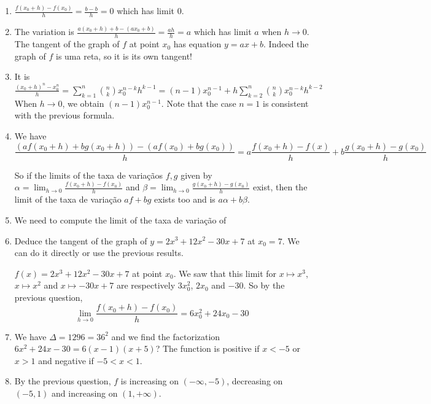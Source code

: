 \begin{enumerate}
\item $\frac{f(x_0+h)-f(x_0)}{h} = \frac{b-b}{h} = 0$ which has limit $0$.

\item The variation is
  $\frac{a{(x_0+h)}+b - {(ax_0+b)}}{h} = \frac{ah}{h} = a$ which has limit $a$
  when $h \rightarrow 0$. The tangent of the graph of $f$ at point $x_0$ has
  equation $y = ax + b$. Indeed the graph of $f$ is uma reta, so it is its own
  tangent!

\item
  It is $\frac{{(x_0+h)}^n - x_0^n}{h} =
  \sum_{k=1}^{n} \binom{n}{k} x_0^{n-k} h^{k-1} =
  {(n-1)} x_0^{n-1} + h \sum_{k=2}^{n} \binom{n}{k} x_0^{n-k} h^{k-2}$
  When $h \rightarrow 0$, we obtain $(n-1)x_0^{n-1}$. Note that the case $n=1$
  is consistent with the previous formula.

\item
  We have
  $$\frac{{(af({x_0+h})+bg({x_0+h}))} - \left(af(x_0)+bg(x_0)\right)}{h} =
  a \frac{f({x_0+h}) - f(x)}{h} + b \frac{g({x_0+h}) - g(x_0)}{h}$$

  So if the limits of the taxa de variaçãos $f,g$ given by
  $\alpha = \lim_{h\rightarrow0} \frac{f({x_0+h}) - f(x_0)}{h}$
  and $\beta = \lim_{h\rightarrow0} \frac{g({x_0+h}) - g(x_0)}{h}$ exist,
  then the limit of the  taxa de variação $af+bg$ exists too and is
  $a\alpha+b\beta$.

\item We need to compute the limit of the taxa de variação of
\item Deduce the tangent of the graph of $y = 2x^3 + 12x^2 - 30x + 7$ at
  $x_0=7$. We can do it directly or use the previous results.

  $f(x) = 2x^3 + 12x^2 - 30x +7$ at point $x_0$.
  We saw that this limit for $x \mapsto x^3$,
  $x \mapsto x^2$ and $x \mapsto -30x+7$ are
  respectively $3x_0^2$, $2x_0$ and $-30$. So by the previous question,
  $$\lim_{h\rightarrow0} \frac{f({x_0+h}) - f(x_0)}{h} = 6x_0^2 + 24x_0 - 30$$

\item We have $\Delta = 1296 = 36^2$ and we find the factorization
  $6x^2 + 24x - 30 = 6{(x-1)}{(x+5)}$?
  The function is positive if $x < -5$ or $x > 1$ and negative if $-5 < x < 1$.

\item By the previous question,
  $f$ is increasing on $(-\infty,-5)$, decreasing on $(-5,1)$ and
  increasing on $(1,+\infty)$.

\end{enumerate}

